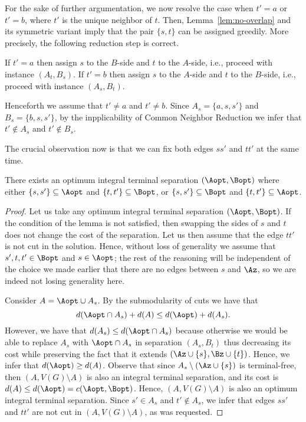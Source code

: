 For the sake of further argumentation, we now resolve the case when $t'=a$ or $t'=b$, where $t'$ is the unique neighbor of $t$. Then, Lemma~\ref{lem:no-overlap} and its symmetric variant imply that the pair $\{s,t\}$ can be assigned greedily. More precisely, the following reduction step is correct.

\begin{reductionstep}\label{red:(1,1)b-corner}
If $t'=a$ then assign $s$ to the $B$-side and $t$ to the $A$-side, i.e., proceed with instance $(A_t,B_s)$. If $t'=b$ then assign $s$ to the $A$-side and $t$ to the $B$-side, i.e., proceed with instance $(A_s,B_t)$.
\end{reductionstep}








Henceforth we assume that $t'\neq a$ and $t'\neq b$. Since $A_s=\{a,s,s'\}$ and $B_s=\{b,s,s'\}$, by the inpplicability of Common Neighbor Reduction we infer that $t'\notin A_s$ and $t'\notin B_s$.

The crucial observation now is that we can fix both edges $ss'$ and $tt'$ at the same time.

\begin{lemma}\label{lem:double-fixing}
There exists an optimum integral terminal separation $(\Aopt,\Bopt)$ where either $\{s,s'\}\subseteq \Aopt$ and $\{t,t'\}\subseteq \Bopt$, or $\{s,s'\}\subseteq \Bopt$ and $\{t,t'\}\subseteq \Aopt$.
\end{lemma}
\begin{proof}
Let us take any optimum integral terminal separation $(\Aopt,\Bopt)$. If the condition of the lemma is not satisfied, then swapping the sides of $s$ and $t$ does not change the cost of the separation. Let us then assume that the edge $tt'$ is not cut in the solution. Hence, without loss of generality we assume that $s',t,t'\in \Bopt$ and $s\in \Aopt$; the rest of the reasoning will be independent of the choice we made earlier that there are no edges between $s$ and $\Az$, so we are indeed not losing generality here.

Consider $A=\Aopt\cup A_s$. By the submodularity of cuts we have that
$$d(\Aopt\cap A_s)+d(A)\leq d(\Aopt)+d(A_s).$$
However, we have that $d(A_s)\leq d(\Aopt\cap A_s)$ because otherwise we would be able to replace $A_s$ with $\Aopt\cap A_s$ in separation $(A_s,B_t)$ thus decreasing its cost while preserving the fact that it extends $(\Az\cup \{s\},\Bz\cup \{t\})$. Hence, we infer that $d(\Aopt)\geq d(A)$. Observe that since $A_s\setminus (\Az\cup \{s\})$ is terminal-free, then $(A,V(G)\setminus A)$ is also an integral terminal separation, and its cost is $d(A)\leq d(\Aopt)=c(\Aopt,\Bopt)$. Hence, $(A,V(G)\setminus A)$ is also an optimum integral terminal separation. Since $s'\in A_s$ and $t'\notin A_s$, we infer that edges $ss'$ and $tt'$ are not cut in $(A,V(G)\setminus A)$, as was requested.
\end{proof}

